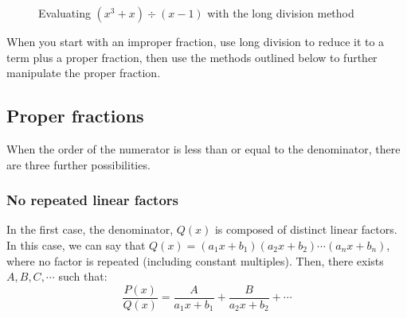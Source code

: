 \begin{figure}[htbp]
\centering
    \caption{Evaluating $(x^3 + x) \div (x - 1)$ with the long division method}
    \label{polylongdiv}
\end{figure}

When you start with an improper fraction, use long division to reduce it to a 
term plus a proper fraction, then use the methods outlined below to further 
manipulate the proper fraction. 

\subsection{Proper fractions}
When the order of the numerator is less than or equal to the denominator, 
there are three further possibilities. 

\subsubsection{No repeated linear factors}
In the first case, the denominator, $Q(x)$ is composed of distinct linear 
factors. In this case, we can say that $Q(x) = (a_1x + b_1)(a_2x + b_2) \cdots 
(a_nx + b_n)$, where no factor is repeated (including constant multiples). 
Then, there exists $A, B, C, \cdots$ such that:
$$\frac{P(x)}{Q(x)} = \frac{A}{a_1x+b_1} + \frac{B}{a_2x + b_2} + \cdots$$

